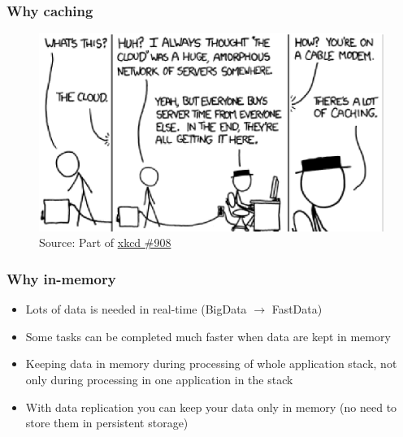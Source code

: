 \documentclass[10pt,utf8]{beamer}
\begin{document}
\begin{frame}
	\frametitle{Why caching}
	\begin{figure}
		\centering
		\includegraphics[width=12cm]{./img/xkcd_908.eps}
		\caption{\tiny{Source: Part of \href{http://xkcd.com/908/}{xkcd \#908}}}
	\end{figure}
\end{frame}

\begin{frame}
	\frametitle{Why in-memory}
	\begin{itemize}
	 \item Lots of data is needed in real-time (BigData $\rightarrow$ FastData)
	 \item Some tasks can be completed much faster when data are kept in memory
	 \item Keeping data in memory during processing of whole application stack, not only during processing in one application in the stack
	 \item With data replication you can keep your data only in memory (no need to store them in persistent storage)
	\end{itemize}
\end{frame}
\end{document}
